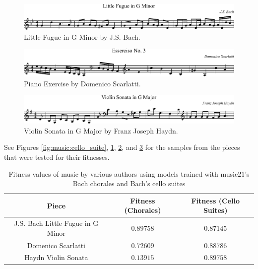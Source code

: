 \begin{figure}[]
	\centering
	\includegraphics[width=\linewidth]{figures/little_fugue.pdf}
	\caption{Little Fugue in G Minor by J.S. Bach.}
	\label{fig:music:little_fugue}
\end{figure}

\begin{figure}[]
	\centering
	\includegraphics[width=\linewidth]{figures/scarlatti.pdf}
	\caption{Piano Exercise by Domenico Scarlatti.}
	\label{fig:music:scarlatti}
\end{figure}

\begin{figure}[]
	\centering
	\includegraphics[width=\linewidth]{figures/haydn.pdf}
	\caption{Violin Sonata in G Major by Franz Joseph Haydn.}
	\label{fig:music:haydn}
\end{figure}

See Figures \ref{fig:music:cello_suite}, \ref{fig:music:little_fugue}, \ref{fig:music:scarlatti}, and \ref{fig:music:haydn} for the samples from the pieces that were tested for their fitnesses.

\begin{table}[]
	\centering
	\begin{tabular}{c | c c}
		Piece & Fitness (Chorales) & Fitness (Cello Suites) \\
		\hline
		J.S. Bach Little Fugue in G Minor & $0.89758$ & $0.87145$ \\
		Domenico Scarlatti & $0.72609$ & $0.88786$ \\
		Haydn Violin Sonata & $0.13915$ & $0.89758$ %
	\end{tabular}
	\caption{Fitness values of music by various authors using models trained with music21's Bach chorales and Bach's cello suites}
	\label{table:fitnesscomp}
\end{table}

